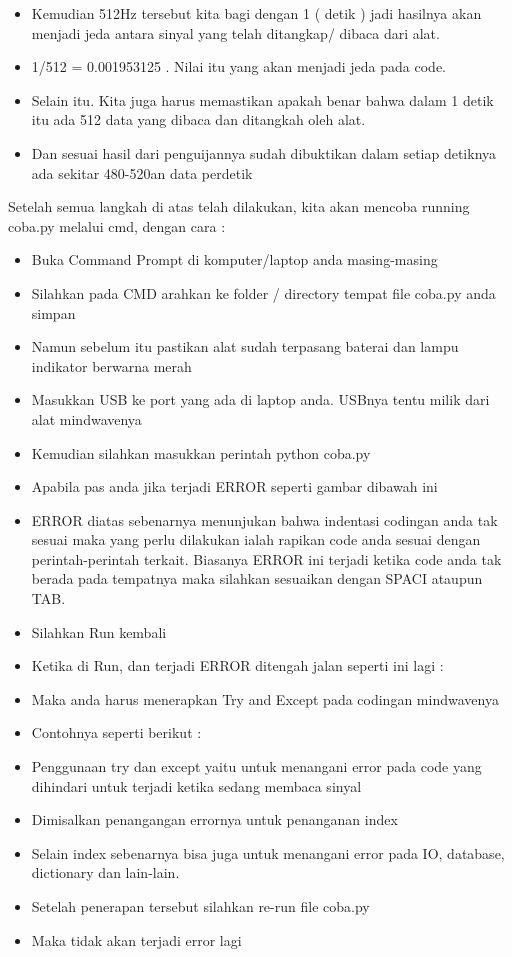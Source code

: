 \begin{itemize}
\item Kemudian 512Hz tersebut kita bagi dengan 1 ( detik ) jadi hasilnya akan menjadi jeda antara sinyal yang telah ditangkap/ dibaca dari alat.
\item 1/512 = 0.001953125 . Nilai itu yang akan menjadi jeda pada code. 
\item Selain itu. Kita juga harus memastikan apakah benar bahwa dalam 1 detik itu ada 512 data yang dibaca dan ditangkah oleh alat.
\item Dan sesuai hasil dari penguijannya sudah dibuktikan dalam setiap detiknya ada sekitar 480-520an data perdetik 
\end{itemize}
 
Setelah semua langkah di atas telah dilakukan, kita akan mencoba running coba.py melalui cmd, dengan cara :
\begin{itemize}
\item Buka Command Prompt di komputer/laptop anda masing-masing 
\item Silahkan pada CMD arahkan ke folder / directory tempat file coba.py anda simpan 
\item Namun sebelum itu pastikan alat sudah terpasang baterai dan lampu indikator berwarna merah 
\item Masukkan USB ke port yang ada di laptop anda. USBnya tentu milik dari alat mindwavenya 
\item Kemudian silahkan masukkan perintah python coba.py 
\item Apabila pas anda jika terjadi ERROR seperti gambar dibawah ini   
 \item ERROR diatas sebenarnya menunjukan bahwa indentasi codingan anda tak sesuai maka yang perlu dilakukan ialah rapikan code anda sesuai dengan perintah-perintah terkait. Biasanya ERROR ini terjadi ketika code anda tak berada pada tempatnya maka silahkan sesuaikan dengan SPACI ataupun TAB. 
\item Silahkan Run kembali
\item Ketika di Run, dan terjadi ERROR ditengah jalan seperti ini lagi : 
\item Maka anda harus menerapkan Try and Except pada codingan mindwavenya 
\item Contohnya seperti berikut : 
\item Penggunaan try dan except yaitu untuk menangani error pada code yang dihindari untuk terjadi ketika sedang membaca sinyal  
\item Dimisalkan penangangan errornya untuk penanganan index 
\item Selain index sebenarnya bisa juga untuk menangani error pada IO, database, dictionary dan lain-lain. 
\item Setelah penerapan tersebut silahkan re-run file coba.py 
\item Maka tidak akan terjadi error lagi 
\end{itemize}

